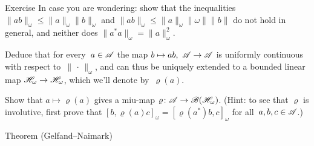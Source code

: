 \documentclass[main]{subfiles}
\begin{document}
\begin{parsec}
\begin{point}{Exercise}
In case you are wondering:
show that the inequalities
$\|ab\|_\omega \leq \|a\|_\omega \|b\|_\omega$
and $\|ab\|_\omega\leq \|a\|_\omega \|\omega\|\|b\|$
do not hold in general,
and neither does $\|a^*a\|_\omega = \|a\|_\omega^2$.

Deduce that for every~$a\in \mathscr{A}$
the map $b\mapsto ab,\ \mathscr{A}\to\mathscr{A}$ is uniformly continuous
with respect to~$\|\,\cdot\,\|_\omega$,
and can thus be uniquely extended to a bounded linear map
$\mathscr{H}_\omega\to\mathscr{H}_\omega$,
which we'll denote by~$\varrho(a)$.

Show that $a\mapsto \varrho(a)$ gives a miu-map 
$\varrho\colon \mathscr{A}\to\mathscr{B}(\mathscr{H}_\omega)$.
(Hint: 
to see that $\varrho$ is involutive,
first
prove that $[b,\varrho(a)c]_\omega = [\varrho(a^*)b,c]_\omega$
for all~$a,b,c\in \mathscr{A}$.)
\end{point}
\begin{point}{Theorem (Gelfand--Naimark)}%
\end{point}
\end{parsec}
\end{document}
